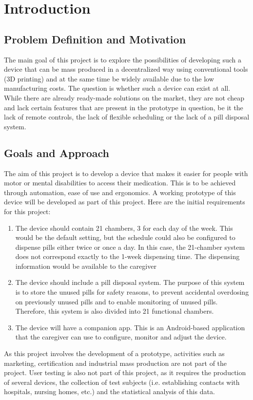 \section{Introduction}
\subsection{Problem Definition and Motivation}
The main goal of this project is to explore the possibilities of developing such a device that can be mass produced in a decentralized way using conventional tools (3D printing) and at the same time be widely available due to the low manufacturing costs. The question is whether such a device can exist at all. While there are already ready-made solutions on the market, they are not cheap and lack certain features that are present in the prototype in question, be it the lack of remote controls, the lack of flexible scheduling or the lack of a pill disposal system.

\subsection{Goals and Approach}
   The aim of this project is to develop a device that makes it easier for people with motor or mental disabilities to access their medication. This is to be achieved through automation, ease of use and ergonomics. A working prototype of this device will be developed as part of this project. Here are the initial requirements for this project:
   \begin{enumerate}
   	
   	\item The device should contain 21 chambers, 3 for each day of the week. This would be the default setting, but the schedule could also be configured to dispense pills either twice or once a day. In this case, the 21-chamber system does not correspond exactly to the 1-week dispensing time. The dispensing information would be available to the caregiver
   	\item The device should include a pill disposal system. The purpose of this system is to store the unused pills for safety reasons, to prevent accidental overdosing on previously unused pills and to enable monitoring of unused pills. Therefore, this system is also divided into 21 functional chambers.
   	\item The device will have a companion app. This is an Android-based application that the caregiver can use to configure, monitor and adjust the device.
\end{enumerate}
 As this project involves the development of a prototype, activities such as marketing, certification and industrial mass production are not part of the project.
User testing is also not part of this project, as it requires the production of several devices, the collection of test subjects (i.e. establishing contacts with hospitals, nursing homes, etc.) and the statistical analysis of this data.


